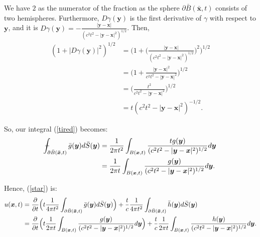 \documentclass[a4paper, 12pt]{article}
\def\Xint#1{\mathchoice
{\XXint\displaystyle\textstyle{#1}}%
{\XXint\textstyle\scriptstyle{#1}}%
{\XXint\scriptstyle\scriptscriptstyle{#1}}%
{\XXint\scriptscriptstyle\scriptscriptstyle{#1}}%
\!\int}
\def\XXint#1#2#3{{\setbox0=\hbox{$#1{#2#3}{\int}$ }
\vcenter{\hbox{$#2#3$ }}\kern-.6\wd0}}
\def\dashint{\Xint-}
\numberwithin{equation}{section}
\begin{document}
We have $2$ as the numerator of the fraction as the sphere
$\partial\bar{B}(\boldsymbol{\bar{x}}, t)$ consists of two hemispheres.
Furthermore, $D\gamma (\boldsymbol{y})$ is the first derivative of $\gamma$ with
respect to $\boldsymbol{y}$, and it is $D\gamma
(\boldsymbol{y})=-\frac{|\boldsymbol{y}-\boldsymbol{x}|}{(c^2
t^2-|\boldsymbol{y}-\boldsymbol{x}|^2)^{1/2}}$. Then,
\begin{equation*}
    \begin{aligned}
        (1+|D\gamma (\boldsymbol{y})|^2)^{1/2}&=\Big(1+\Big(\frac{|\boldsymbol{y}-\boldsymbol{x}|}{(c^2 t^2-|\boldsymbol{y}-\boldsymbol{x}|^2)^{1/2}}\Big)^2\Big)^{1/2}\\
        &=\Big(1+\frac{|\boldsymbol{y}-\boldsymbol{x}|^2}{c^2 t^2-|\boldsymbol{y}-\boldsymbol{x}|^2}\Big)^{1/2}\\
        &=\Big(\frac{t^2}{c^2 t^2-|\boldsymbol{y}-\boldsymbol{x}|^2}\Big)^{1/2}\\
        &=t(c^2 t^2-|\boldsymbol{y}-\boldsymbol{x}|^2)^{-1/2}.
    \end{aligned}
\end{equation*}

So, our integral (\ref{tired}) becomes:
\begin{equation*}
    \begin{aligned}
        \dashint_{\partial \bar{B}(\boldsymbol{\bar{x}}, t)} \bar{g}(\boldsymbol{y}) d\bar{S}(\boldsymbol{y})&=\frac{1}{2 \pi t^2}\int_{B(\boldsymbol{x},t)}\frac{tg(\boldsymbol{y})}{(c^2 t^2-|\boldsymbol{y}-\boldsymbol{x}|^2)^{1/2}}d\boldsymbol{y}\\
        &=\frac{1}{2 \pi t}\int_{B(\boldsymbol{x},t)}\frac{g(\boldsymbol{y})}{(c^2 t^2-|\boldsymbol{y}-\boldsymbol{x}|^2)^{1/2}}d\boldsymbol{y}.
    \end{aligned}
\end{equation*}

Hence, (\ref{star}) is: 
\begin{equation*}
    \begin{aligned}
        u(\boldsymbol{x},t)&=\diffp[1]{}{t}\Big(t \frac{1}{4 \pi t^2} \int_{\partial \bar{B}(\boldsymbol{\bar{x}}, t)} \bar{g}(\boldsymbol{y})d\bar{S} (\boldsymbol{y})\Big)+ \frac{t}{c}\frac{1}{4 \pi t^2} \int_{\partial \bar{B}(\boldsymbol{\bar{x}}, t)} \bar{h}(\boldsymbol{y})d\bar{S}(\boldsymbol{y})\\
        &=\diffp[1]{}{t}\Big(t \frac{1}{2 \pi t} \int_{B(\boldsymbol{x}, t)} \frac{g(\boldsymbol{y})}{(c^2 t^2-|\boldsymbol{y}-\boldsymbol{x}|^2)^{1/2}}d\boldsymbol{y}\Big)+\frac{t}{c}\frac{1}{2 \pi t} \int_{B(\boldsymbol{x}, t)} \frac{h(\boldsymbol{y})}{(c^2 t^2-|\boldsymbol{y}-\boldsymbol{x}|^2)^{1/2}}d\boldsymbol{y}.
    \end{aligned}
\end{equation*}
\end{document}
